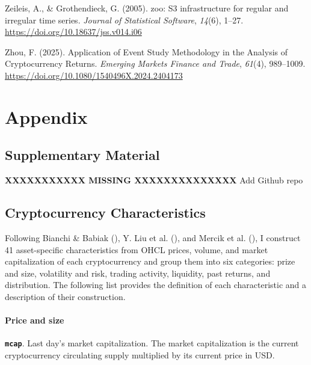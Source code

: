 \documentclass[
  12pt,
  a4paper,
  openany]{scrbook}
\newlength{\cslhangindent}
\newenvironment{CSLReferences}[2] %
 {\begin{list}{}{%
  \setlength{\itemindent}{0pt}
  \setlength{\leftmargin}{0pt}
  \setlength{\parsep}{0pt}
  \ifodd #1
   \setlength{\leftmargin}{\cslhangindent}
   \setlength{\itemindent}{-1\cslhangindent}
  \fi
  \setlength{\itemsep}{#2\baselineskip}}}
 {\end{list}}
\begin{document}
\begin{CSLReferences}{1}{0}
Zeileis, A., \& Grothendieck, G. (2005). {zoo}: S3 infrastructure for
regular and irregular time series. \emph{Journal of Statistical
Software}, \emph{14}(6), 1--27.
\url{https://doi.org/10.18637/jss.v014.i06}

Zhou, F. (2025). Application of Event Study Methodology in the Analysis
of Cryptocurrency Returns. \emph{Emerging Markets Finance and Trade},
\emph{61}(4), 989--1009.
\url{https://doi.org/10.1080/1540496X.2024.2404173}

\end{CSLReferences}

\cleardoublepage
{}
{}
\appendix

\chapter{Appendix}\label{appendix}

\section{Supplementary Material}\label{sec-app_material}

\textbf{XXXXXXXXXXX MISSING XXXXXXXXXXXXXX} Add Github repo

\section{Cryptocurrency Characteristics}\label{sec-app_characteristics}

Following Bianchi \& Babiak
(), Y. Liu et
al. (), and Mercik et al.
(),
I construct 41 asset-specific characteristics from OHCL prices, volume,
and market capitalization of each cryptocurrency and group them into six
categories: prize and size, volatility and risk, trading activity,
liquidity, past returns, and distribution. The following list provides
the definition of each characteristic and a description of their
construction.

\subsubsection{Price and size}\label{price-and-size}

\textbf{\texttt{mcap}}. Last day's market capitalization. The market
capitalization is the current cryptocurrency circulating supply
multiplied by its current price in USD.
\end{document}
